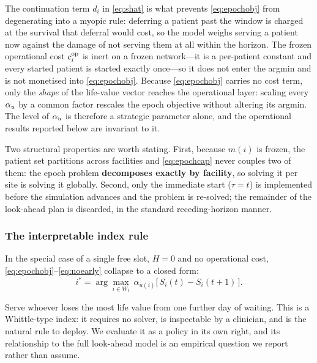 The continuation term $d_i$ in \eqref{eq:shat} is what prevents
\eqref{eq:epochobj} from degenerating into a myopic rule: deferring a patient
past the window is charged at the survival that deferral would cost, so the
model weighs serving a patient now against the damage of not serving them at
all within the horizon. The frozen operational cost $c^{\mathrm{op}}_i$ is inert on a
frozen network---it is a per-patient constant and every started patient is
started exactly once---so it does not enter the argmin and is not monetised
into \eqref{eq:epochobj}. Because \eqref{eq:epochobj} carries no cost term,
only the \emph{shape} of the life-value vector reaches the operational layer:
scaling every $\alpha_{u}$ by a common factor rescales the epoch objective without
altering its argmin. The level of $\alpha_{u}$ is therefore a strategic parameter
alone, and the operational results reported below are invariant to it.

Two structural properties are worth stating. First, because $m(i)$ is frozen,
the patient set partitions across facilities and \eqref{eq:epochcap} never
couples two of them: the epoch problem \textbf{decomposes exactly by facility},
so solving it per site is solving it globally. Second, only the immediate start
($\tau = t$) is implemented before the simulation advances and the problem is
re-solved; the remainder of the look-ahead plan is discarded, in the standard
receding-horizon manner.

\subsubsection{The interpretable index rule}

In the special case of a single free slot, $H = 0$ and no operational cost,
\eqref{eq:epochobj}--\eqref{eq:noearly} collapse to a closed form:
\begin{equation}
  i^{*} = \arg\max_{i \in W_t}\ \alpha_{u(i)}\bigl[\,S_i(t) - S_i(t+1)\,\bigr].
  \label{eq:index}
\end{equation}

Serve whoever loses the most life value from one further day of
waiting. This is a Whittle-type index: it requires no solver, is inspectable by
a clinician, and is the natural rule to deploy. We evaluate it as a policy in
its own right, and its relationship to the full look-ahead model is an
empirical question we report rather than assume.

